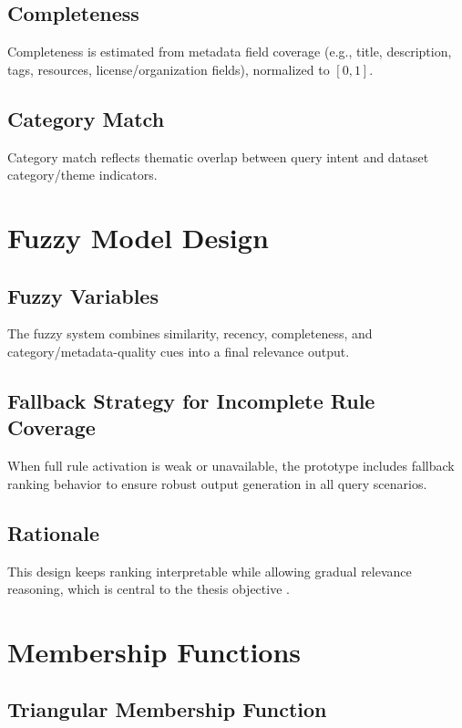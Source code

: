 \documentclass[11pt,a4paper]{article}
\begin{document}
\subsection{Completeness}

Completeness is estimated from metadata field coverage (e.g., title, description, tags, resources, license/organization fields), normalized to $[0,1]$.

\subsection{Category Match}

Category match reflects thematic overlap between query intent and dataset category/theme indicators.

\section{Fuzzy Model Design}

\subsection{Fuzzy Variables}

The fuzzy system combines similarity, recency, completeness, and category/metadata-quality cues into a final relevance output.

\subsection{Fallback Strategy for Incomplete Rule Coverage}

When full rule activation is weak or unavailable, the prototype includes fallback ranking behavior to ensure robust output generation in all query scenarios.

\subsection{Rationale}

This design keeps ranking interpretable while allowing gradual relevance reasoning, which is central to the thesis objective \citep{zadeh1965,mamdani1974,doshi2017}.

\section{Membership Functions}

\subsection{Triangular Membership Function}
\end{document}

